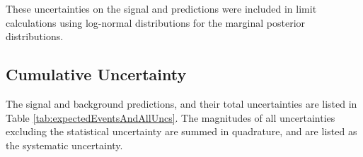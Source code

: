 These uncertainties on the signal and \DY predictions were included in limit calculations using log-normal distributions for the 
marginal posterior distributions.


\subsection{Cumulative Uncertainty}
\label{sec:cumulativeUnc}
The signal and background predictions, and their total uncertainties are listed in Table \ref{tab:expectedEventsAndAllUncs}.  The 
magnitudes of all uncertainties excluding the statistical uncertainty are summed in quadrature, and are listed as the systematic 
uncertainty.


